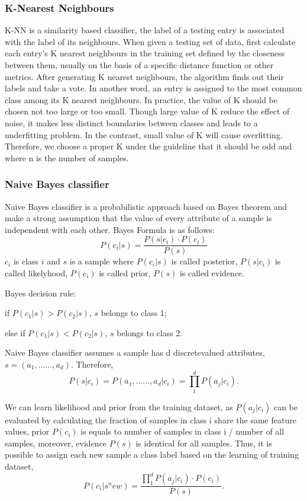 \documentclass[conference]{IEEEtran}
\begin{document}
\subsubsection{K-Nearest Neighbours}
K-NN is a similarity based classifier, the label of a testing entry is associated with the label of its neighbours. When given a testing set of data, first calculate each entry’s K nearest neighbours in the training set defined by the closeness between them, usually on the basis of a specific distance function or other metrics. After generating K nearest neighbours, the algorithm finds out their labels and take a vote. In another word, an entry is assigned to the most common class among its K nearest neighbours. 
In practice, the value of K should be chosen not too large or too small\cite{Everitt}. Though large value of K reduce the effect of noise, it makes less distinct boundaries between classes and leads to a underfitting problem. In the contrast, small value of K will cause overfitting. Therefore, we choose a proper K under the guideline that it should be odd and  where n is the number of samples.

\subsubsection{Naive Bayes classifier}
Naive Bayes classifier is a probabilistic approach based on Bayes theorem and make a strong assumption that the value of every attribute of a sample is independent with each other\cite{Narasimha}. Bayes Formula is as follows: 
\begin{equation}
P(c_i|s) = \frac{P(s|c_i) \cdot P(c_i)}{P(s)}
\end{equation}
$c_i$ is class $i$ and $s$ is a sample
where $P(c_i|s)$ is called posterior, $P(s|c_i)$ is called likelyhood, $P(c_i)$ is called prior, $P(s)$ is called evidence.

Bayes decision rule:

if $P(c_1|s) > P(c_2|s)$, $s$ belongs to class 1;

else if $P(c_1|s) < P(c_2|s)$, $s$ belongs to class 2. 

Naive Bayes classifier assumes a sample has d discrete­valued attributes, $s = (a_1, ......, a_d)$. Therefore, 
\begin{equation*}
P(s|c_i) = P(a_1, ......, a_d|c_i) = \prod^d_1P(a_j|c_i).
\end{equation*}


We can learn likelihood and prior from the training dataset, as $P(a_j|c_i)$ can be evaluated by calculating the fraction of samples in class i share the same feature values, prior $P(c_i)$ is equals to number of samples in class i / number of all samples, moreover, evidence $P(s)$ is identical for all samples. Thus, it is possible to assign each new sample a class label based
on the learning of training dataset, 
\begin{equation*}
P(c_i|s^new) = \frac{\prod^d_1 P(a_j|c_i) \cdot P(c_i)}{P(s)}.
\end{equation*}
\end{document}
